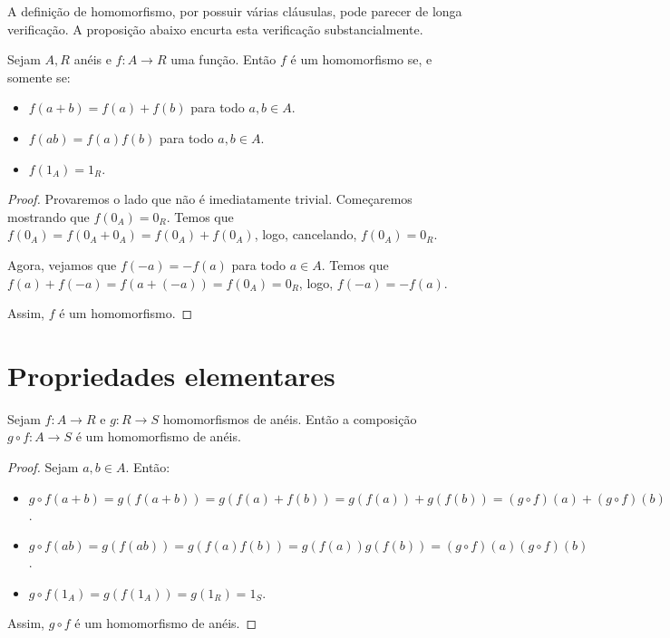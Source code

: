 A definição de homomorfismo, por possuir várias cláusulas, pode parecer de longa verificação.
A proposição abaixo encurta esta verificação substancialmente.

\begin{prop}
    Sejam $A, R$ anéis e $f:A\rightarrow R$ uma função.
    Então $f$ é um homomorfismo se, e somente se:
    \begin{itemize}
        \item $f(a+b)=f(a)+f(b)$ para todo $a, b \in A$.
        \item $f(ab)=f(a)f(b)$ para todo $a, b \in A$.
        \item $f(1_A)=1_R$.
    \end{itemize}
\end{prop}
\begin{proof}
    Provaremos o lado que não é imediatamente trivial.
    Começaremos mostrando que $f(0_A)=0_R$.
    Temos que $f(0_A)=f(0_A+0_A)=f(0_A)+f(0_A)$, logo, cancelando, $f(0_A)=0_R$.

    Agora, vejamos que $f(-a)=-f(a)$ para todo $a \in A$.
    Temos que $f(a)+f(-a)=f(a+(-a))=f(0_A)=0_R$, logo, $f(-a)=-f(a)$.

    Assim, $f$ é um homomorfismo.
\end{proof}

\section{Propriedades elementares}
\begin{lemma}
    Sejam $f:A\rightarrow R$ e $g:R\rightarrow S$ homomorfismos de anéis.
    Então a composição $g\circ f:A\rightarrow S$ é um homomorfismo de anéis.
\end{lemma}

\begin{proof}
    Sejam $a, b \in A$. Então:
    \begin{itemize}
        \item $g\circ f(a+b)=g(f(a+b))=g(f(a)+f(b))=g(f(a))+g(f(b))=(g\circ f)(a)+(g\circ f)(b)$.
        \item $g\circ f(ab)=g(f(ab))=g(f(a)f(b))=g(f(a))g(f(b))=(g\circ f)(a)(g\circ f)(b)$.
        \item $g\circ f(1_A)=g(f(1_A))=g(1_R)=1_S$.
    \end{itemize}
    Assim, $g\circ f$ é um homomorfismo de anéis.
\end{proof}

